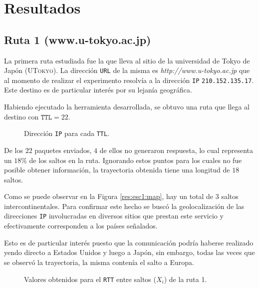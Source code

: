 \section{Resultados}

\subsection{Ruta 1 (www.u-tokyo.ac.jp)}

La primera ruta estudiada fue la que lleva al sitio de la
universidad de Tokyo de Japón (\textsc{UTokyo}). La dirección \texttt{URL} de la
misma es \emph{http://www.u-tokyo.ac.jp} que al momento de realizar el
experimento resolvía a la dirección \texttt{IP} \texttt{210.152.135.17}. Este
destino es de particular interés por su lejanía geográfica.

Habiendo ejecutado la herramienta desarrollada, se obtuvo una ruta que llega al
destino con $\texttt{TTL} = 22$.

\begin{figure}[H]
    \caption{Dirección \texttt{IP} para cada \texttt{TTL}.}
\end{figure}

De los $22$ paquetes enviados, $4$ de ellos no generaron
respuesta, lo cual representa un $18$\% de los saltos en la ruta. Ignorando
estos puntos para los cuales no fue posible obtener información, la trayectoria
obtenida tiene una longitud de $18$ saltos.

Como se puede observar en la Figura \ref{res:esc1:map}, hay un total de 3 saltos
intercontinentales. Para confirmar este hecho se buscó la geolocalización de las
direcciones \texttt{IP} involucradas en diversos sitios que prestan este
servicio y efectivamente corresponden a los países señalados.

\begin{figure*}
    \caption{Localización de saltos según geolocalización de direcciones IP para
    el sitio \emph{www.u-tokyo.ac.jp}.}
    \label{res:esc1:map}
\end{figure*}

Esto es de particular interés puesto que la comunicación podría haberse
realizado yendo directo a Estados Unidos y luego a Japón, sin embargo, todas las
veces que se observó la trayectoria, la misma contenía el salto a Europa.

\begin{figure}[H]
    \caption{Valores obtenidos para el \texttt{RTT} entre saltos ($X_i$) de la ruta 1.}
    \label{res:esc1:rtt}
\end{figure}

